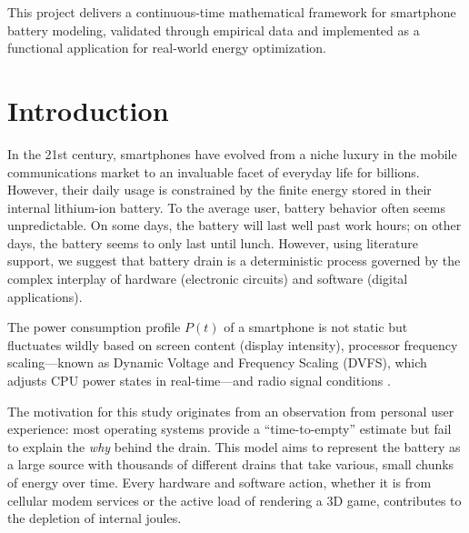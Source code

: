\documentclass[12pt]{article}
\begin{document}
\vspace{1ex}
\noindent This project delivers a continuous-time mathematical framework for smartphone battery modeling, validated through empirical data and implemented as a functional application for real-world energy optimization.

\newpage


\tableofcontents
\newpage



\section{Introduction}

\noindent\hspace*{\parindent}In the 21st century, smartphones have evolved from a niche luxury in the mobile communications market to an invaluable facet of everyday life for billions. However, their daily usage is constrained by the finite energy stored in their internal lithium-ion battery. To the average user, battery behavior often seems unpredictable. On some days, the battery will last well past work hours; on other days, the battery seems to only last until lunch. However, using literature support, we suggest that battery drain is a deterministic process governed by the complex interplay of hardware (electronic circuits) and software (digital applications).

The power consumption profile $P(t)$ of a smartphone is not static but fluctuates wildly based on screen content (display intensity), processor frequency scaling---known as Dynamic Voltage and Frequency Scaling (DVFS), which adjusts CPU power states in real-time---and radio signal conditions \cite{1}.

The motivation for this study originates from an observation from personal user experience: most operating systems provide a ``time-to-empty'' estimate but fail to explain the \textit{why} behind the drain. This model aims to represent the battery as a large source with thousands of different drains that take various, small chunks of energy over time. Every hardware and software action, whether it is from cellular modem services or the active load of rendering a 3D game, contributes to the depletion of internal joules\cite{14}.
\end{document}
